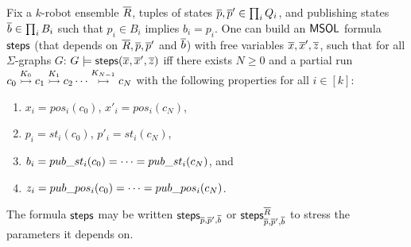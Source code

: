 

\begin{lemma} \label{lem:steps}
Fix a $k$-robot ensemble $\tup{R}$, tuples of states $\tup{p},\tup{p}' \in \prod_i Q_i$, and 
publishing states $\tup{b} \in \prod_i B_i$ such that $p_i \in B_i$ implies $b_i = p_i$.
One can build an $\msol$ formula $\steps$ (that depends on $\tup{R},\tup{p},\tup{p}'$ and $\tup{b}$) with free variables 
$\tup{x}, \tup{x}', \tup{z}$, such that 
for all $\Sigma$-graphs $G$: $G \models \steps(\tup{x}, \tup{x}', \tup{z})$ iff there exists $N \geq 0$ and a partial run  
$\onestep{c_0}{c_1}{K_0}\onestep{}{c_2}{K_1} \cdots \onestep{}{c_N}{K_{N-1}}$ with the following properties for all $i \in [k]$:
\begin{enumerate}
 \item $x_i = pos_i(c_0)$, $x'_i = pos_i(c_N)$,
 \item $p_i = st_i(c_0)$, $p'_i = st_i(c_N)$,
 \item $b_i = \bcst_i(c_0) = \dots = \bcst_i(c_N)$, and
 \item $z_i = \bcpos_i(c_0) = \dots = \bcpos_i(c_N)$.
 \end{enumerate}
The formula $\steps$ may be written $\steps_{\tup{p},\tup{p}',\tup{b}}$ or $\steps^{\tup{R}}_{\tup{p},\tup{p}',\tup{b}}$ to stress the parameters it depends on.
\end{lemma}

